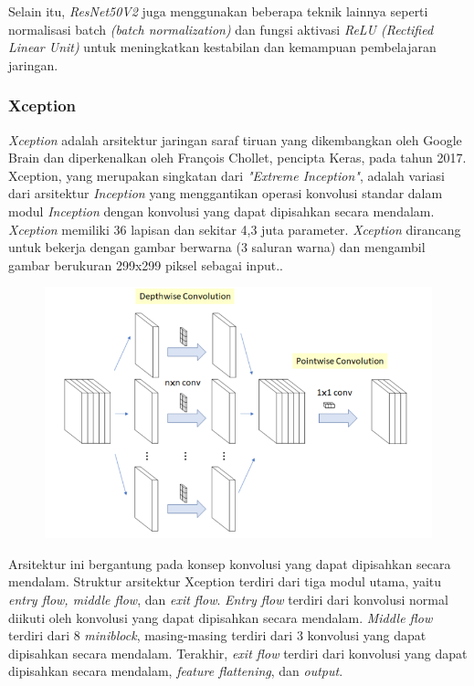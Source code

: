 Selain itu, \textit{ResNet50V2} juga menggunakan beberapa teknik lainnya seperti normalisasi batch \textit{(batch normalization)} dan fungsi aktivasi \textit{ReLU (Rectified Linear Unit)} untuk meningkatkan kestabilan dan kemampuan pembelajaran jaringan. \cite{prusty2022resnet50v2}

\subsubsection{Xception}
\textit{Xception} adalah arsitektur jaringan saraf tiruan yang dikembangkan oleh Google Brain dan diperkenalkan oleh François Chollet, pencipta Keras, pada tahun 2017. Xception, yang merupakan singkatan dari \textit{"Extreme Inception"}, adalah variasi dari arsitektur \textit{Inception} yang menggantikan operasi konvolusi standar dalam modul \textit{Inception} dengan konvolusi yang dapat dipisahkan secara mendalam. \textit{Xception} memiliki 36 lapisan dan sekitar 4,3 juta parameter. \textit{Xception} dirancang untuk bekerja dengan gambar berwarna (3 saluran warna) dan mengambil gambar berukuran 299x299 piksel sebagai input.. \cite{chollet2017xception}

\begin{figure} [ht] \centering
  \includegraphics[scale=0.7]{gambar/bener/konsep-separable-convolutions.png}
  \label{fig:Konsep Separable Convolutions dari Xception}
\end{figure}

Arsitektur ini bergantung pada konsep konvolusi yang dapat dipisahkan secara mendalam. Struktur arsitektur Xception terdiri dari tiga modul utama, yaitu \textit{entry flow, middle flow}, dan \textit{exit flow}. \textit{Entry flow} terdiri dari konvolusi normal diikuti oleh konvolusi yang dapat dipisahkan secara mendalam. \textit{Middle flow} terdiri dari 8 \textit{miniblock}, masing-masing terdiri dari 3 konvolusi yang dapat dipisahkan secara mendalam. Terakhir, \textit{exit flow} terdiri dari konvolusi yang dapat dipisahkan secara mendalam, \textit{feature flattening}, dan \textit{output}.


